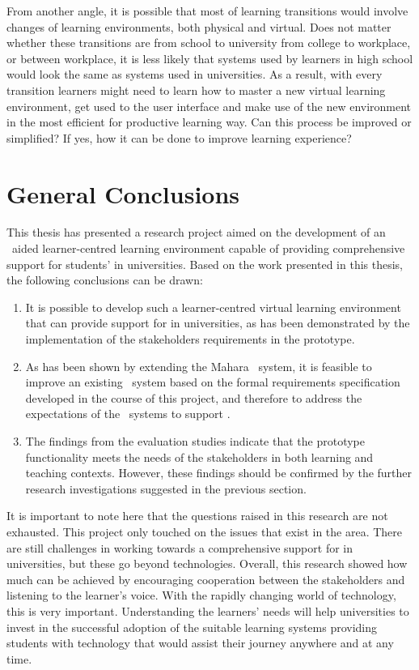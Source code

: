 From another angle, it is possible that most of learning transitions would
involve changes of learning environments, both physical and virtual. Does not
matter whether these transitions are from school to university from college to
workplace, or between workplace, it is less likely that systems used by learners
in high school would look the same as systems used in universities. As a result,
with every transition learners might need to learn how to master a new virtual
learning environment, get used to the user interface and make use of the new
environment in the most efficient for productive learning way. Can this process
be improved or simplified? If yes, how it can be done to improve learning
experience?

\section{General Conclusions}

This thesis has presented a research project aimed on the development of an
\ep~aided learner-centred learning environment capable of providing
comprehensive support for students' \LLLs in universities. Based on the work
presented in this thesis, the following conclusions can be drawn:
\begin{enumerate}
  \item It is possible to develop such a learner-centred virtual learning
  environment that can provide support for \LLLs in universities, as has been
  demonstrated by the implementation of the stakeholders requirements in the
  prototype.
  \item As has been shown by extending the Mahara \ep~system, it is feasible to
  improve an existing \ep~system based on the formal requirements specification
  developed in the course of this project, and therefore to address the
  expectations of the \ep~systems to support \LLLsn.
  \item The findings from the evaluation studies indicate that the prototype
  functionality meets the needs of the stakeholders in both learning and
  teaching contexts. However, these findings should be confirmed by the further
  research investigations suggested in the previous section.
\end{enumerate}

It is important to note here that the questions raised in this research are
not exhausted. This project only touched on the issues that exist in the area.
There are still challenges in working towards a comprehensive support for \LLLs
in universities, but these go beyond technologies. Overall, this research showed
how much can be achieved by encouraging cooperation between the stakeholders and
listening to the learner's voice. With the rapidly changing world of technology,
this is very important. Understanding the learners' needs will help universities
to invest in the successful adoption of the suitable learning systems providing
students with technology that would assist their \LLLs journey anywhere and at
any time.
